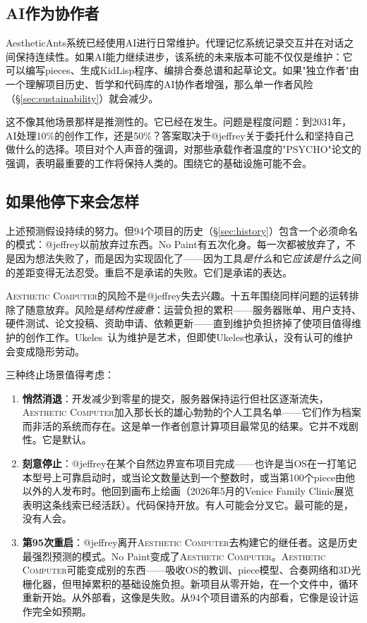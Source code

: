 \documentclass[10pt,letterpaper,twocolumn]{article}
\newcommand{\ac}{\textsc{Aesthetic Computer}}
\begin{document}
\subsection{AI作为协作者}

AestheticAnts系统已经使用AI进行日常维护。代理记忆系统记录交互并在对话之间保持连续性。如果AI能力继续进步，该系统的未来版本可能不仅仅是维护：它可以编写pieces、生成KidLisp程序、编排合奏总谱和起草论文。如果"独立作者"由一个理解项目历史、哲学和代码库的AI协作者增强，那么单一作者风险（\S\ref{sec:sustainability}）就会减少。

这不像其他场景那样是推测性的。它已经在发生。问题是程度问题：到2031年，AI处理10\%的创作工作，还是50\%？答案取决于@jeffrey关于委托什么和坚持自己做什么的选择。项目对个人声音的强调，对那些承载作者温度的"PSYCHO"论文的强调，表明最重要的工作将保持人类的。围绕它的基础设施可能不会。

\subsection{如果他停下来会怎样}
\label{sec:giveup}

上述预测假设持续的努力。但94个项目的历史（\S\ref{sec:history}）包含一个必须命名的模式：@jeffrey以前放弃过东西。No Paint有五次化身。每一次都被放弃了，不是因为想法失败了，而是因为实现固化了——因为工具\emph{是什么}和它\emph{应该是什么}之间的差距变得无法忍受。重启不是承诺的失败。它们是承诺的表达。

\ac{}的风险不是@jeffrey失去兴趣。十五年围绕同样问题的运转排除了随意放弃。风险是\emph{结构性疲惫}：运营负担的累积——服务器账单、用户支持、硬件测试、论文投稿、资助申请、依赖更新——直到维护负担挤掉了使项目值得维护的创作工作。Ukeles~\citep{ukeles1969manifesto}认为维护是艺术，但即使Ukeles也承认，没有认可的维护会变成隐形劳动。

三种终止场景值得考虑：

\begin{enumerate}
  \item \textbf{悄然消退}：开发减少到零星的提交，服务器保持运行但社区逐渐流失，\ac{}加入那长长的雄心勃勃的个人工具名单——它们作为档案而非活的系统而存在。这是单一作者创意计算项目最常见的结果。它并不戏剧性。它是默认。

  \item \textbf{刻意停止}：@jeffrey在某个自然边界宣布项目完成——也许是当OS在一打笔记本型号上可靠启动时，或当论文数量达到一个整数时，或当第100个piece由他以外的人发布时。他回到画布上绘画（2026年5月的Venice Family Clinic展览表明这条线索已经活跃）。代码保持开放。有人可能会分叉它。最可能的是，没有人会。

  \item \textbf{第95次重启}：@jeffrey离开\ac{}去构建它的继任者。这是历史最强烈预测的模式。No Paint变成了\ac{}。\ac{}可能变成别的东西——吸收OS的教训、piece模型、合奏网络和3D光栅化器，但甩掉累积的基础设施负担。新项目从零开始，在一个文件中，循环重新开始。从外部看，这像是失败。从94个项目谱系的内部看，它像是设计运作完全如预期。
\end{enumerate}
\end{document}
